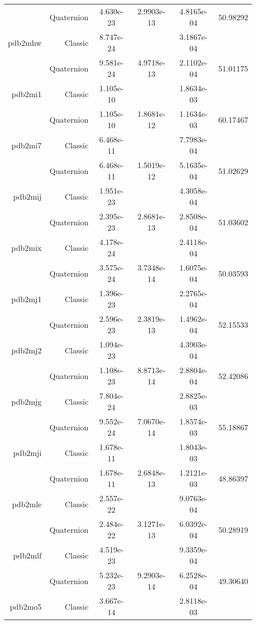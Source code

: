 \begin{xltabular}{\textwidth}{r|rS[table-format=1.3e+2]S[table-format=1.4e+2]S[table-format=1.4e+2]S[table-format=-1.5]}
& Quaternion & 4.630e-23 & 2.9903e-13 & 4.8165e-04 & 50.98292\\  \addlinespace
pdb2mhw & Classic & 8.747e-24 &  & 3.1867e-04 & \\
& Quaternion & 9.581e-24 & 4.9718e-13 & 2.1102e-04 & 51.01175\\  \addlinespace
pdb2mi1 & Classic & 1.105e-10 &  & 1.8634e-03 & \\
& Quaternion & 1.105e-10 & 1.8681e-12 & 1.1634e-03 & 60.17467\\  \addlinespace
pdb2mi7 & Classic & 6.468e-11 &  & 7.7983e-04 & \\
& Quaternion & 6.468e-11 & 1.5019e-12 & 5.1635e-04 & 51.02629\\  \addlinespace
pdb2mij & Classic & 1.951e-23 &  & 4.3058e-04 & \\
& Quaternion & 2.395e-23 & 2.8681e-13 & 2.8508e-04 & 51.03602\\  \addlinespace
pdb2mix & Classic & 4.178e-24 &  & 2.4118e-04 & \\
& Quaternion & 3.575e-24 & 3.7348e-14 & 1.6075e-04 & 50.03593\\  \addlinespace
pdb2mj1 & Classic & 1.396e-23 &  & 2.2765e-04 & \\
& Quaternion & 2.596e-23 & 2.3819e-13 & 1.4962e-04 & 52.15533\\  \addlinespace
pdb2mj2 & Classic & 1.094e-23 &  & 4.3903e-04 & \\
& Quaternion & 1.108e-23 & 8.8713e-14 & 2.8804e-04 & 52.42086\\  \addlinespace
pdb2mjg & Classic & 7.804e-24 &  & 2.8825e-03 & \\
& Quaternion & 9.552e-24 & 7.0670e-14 & 1.8574e-03 & 55.18867\\  \addlinespace
pdb2mji & Classic & 1.678e-11 &  & 1.8043e-03 & \\
& Quaternion & 1.678e-11 & 2.6848e-13 & 1.2121e-03 & 48.86397\\  \addlinespace
pdb2mle & Classic & 2.557e-22 &  & 9.0763e-04 & \\
& Quaternion & 2.484e-22 & 3.1271e-13 & 6.0392e-04 & 50.28919\\  \addlinespace
pdb2mlf & Classic & 4.519e-23 &  & 9.3359e-04 & \\
& Quaternion & 5.232e-23 & 9.2903e-14 & 6.2528e-04 & 49.30640\\  \addlinespace
pdb2mo5 & Classic & 3.667e-14 &  & 2.8118e-03 & \\

\end{xltabular}
